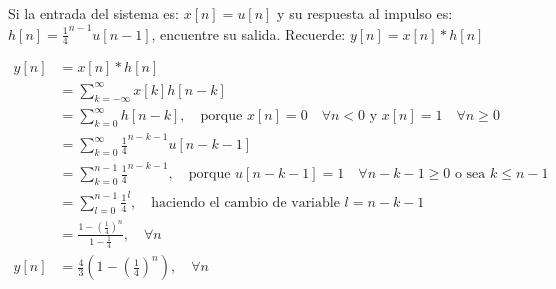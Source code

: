 \documentclass[addpoints,answers]{exam}
\begin{document}
\begin{questions}
\begin{solution}

\end{solution}

\question[5]
Si la entrada del sistema es: \(x[n] = u[n]\) y su respuesta al impulso es: \(h[n] = \frac{1}{4}^{n-1} u[n-1]\), encuentre su salida. Recuerde: \(y[n] = x[n] * h[n]\)

\begin{solution}
\[
\begin{array}{ll}
	y[n]	&= x[n] * h[n] \\
			&= \sum_{k=-\infty}^{\infty}x[k]h[n-k] \\
			&= \sum_{k=0}^{\infty}h[n-k], \quad \text{porque } x[n]=0 \quad \forall n<0 \text{ y } x[n]=1 \quad \forall n \geq 0 \\
			&= \sum_{k=0}^{\infty}\frac{1}{4}^{n-k-1} u[n-k-1] \\
			&= \sum_{k=0}^{n-1}\frac{1}{4}^{n-k-1}, \quad \text{porque } u[n-k-1]=1 \quad \forall n-k-1 \geq 0 \text{ o sea  } k \leq n-1 \\
			&= \sum_{l=0}^{n-1}\frac{1}{4}^{l}, \quad \text{haciendo el cambio de variable } l=n-k-1 \\
			&= \frac{1-\left(\frac{1}{4}\right)^n}{1-\frac{1}{4}}, \quad \forall n \\
	y[n]	&= \frac{4}{3}\left(1-\left(\frac{1}{4}\right)^n\right), \quad \forall n
\end{array}
\]
\end{solution}

\end{questions}

\footrule
{}
\end{document}
